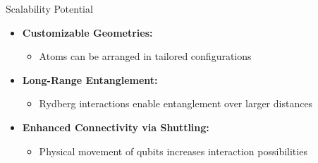 \begin{frame}{Scalability Potential}
  \begin{itemize}
    \item \textbf{Customizable Geometries:}
      \begin{itemize}
        \item Atoms can be arranged in tailored configurations
      \end{itemize}
    \item \textbf{Long-Range Entanglement:}
      \begin{itemize}
        \item Rydberg interactions enable entanglement over larger distances
      \end{itemize}
    \item \textbf{Enhanced Connectivity via Shuttling:}
      \begin{itemize}
        \item Physical movement of qubits increases interaction possibilities
      \end{itemize}
  \end{itemize}
\end{frame}

